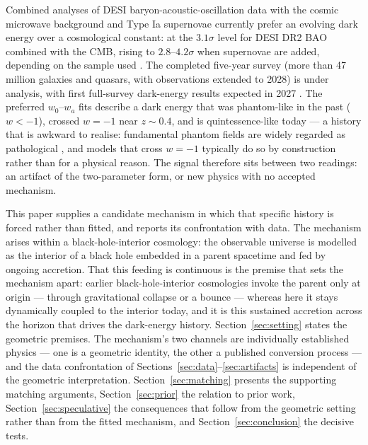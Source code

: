 \documentclass[11pt,a4paper]{article}
\begin{document}
Combined analyses of DESI baryon-acoustic-oscillation data with the cosmic microwave background and Type Ia supernovae currently prefer an evolving dark energy over a cosmological constant: at the $3.1\sigma$ level for DESI DR2 BAO combined with the CMB, rising to $2.8$--$4.2\sigma$ when supernovae are added, depending on the sample used \citep{DESI_DR1,DESI_DR2}. The completed five-year survey (more than 47 million galaxies and quasars, with observations extended to 2028) is under analysis, with first full-survey dark-energy results expected in 2027 \citep{DESI_completion}. The preferred $w_0$--$w_a$ fits \citep{ChevallierPolarski2001,Linder2003} describe a dark energy that was phantom-like in the past ($w<-1$), crossed $w=-1$ near $z\sim0.4$, and is quintessence-like today \citep{DESI_DR2} --- a history that is awkward to realise: fundamental phantom fields are widely regarded as pathological \citep{Caldwell2002,CarrollHoffmanTrodden2003}, and models that cross $w=-1$ typically do so by construction rather than for a physical reason. The signal therefore sits between two readings: an artifact of the two-parameter form, or new physics with no accepted mechanism.

This paper supplies a candidate mechanism in which that specific history is forced rather than fitted, and reports its confrontation with data. The mechanism arises within a black-hole-interior cosmology: the observable universe is modelled as the interior of a black hole embedded in a parent spacetime and fed by ongoing accretion. That this feeding is continuous is the premise that sets the mechanism apart: earlier black-hole-interior cosmologies invoke the parent only at origin --- through gravitational collapse or a bounce --- whereas here it stays dynamically coupled to the interior today, and it is this sustained accretion across the horizon that drives the dark-energy history. Section~\ref{sec:setting} states the geometric premises. The mechanism's two channels are individually established physics --- one is a geometric identity, the other a published conversion process --- and the data confrontation of Sections~\ref{sec:data}--\ref{sec:artifacts} is independent of the geometric interpretation. Section~\ref{sec:matching} presents the supporting matching arguments, Section~\ref{sec:prior} the relation to prior work, Section~\ref{sec:speculative} the consequences that follow from the geometric setting rather than from the fitted mechanism, and Section~\ref{sec:conclusion} the decisive tests.
\end{document}
